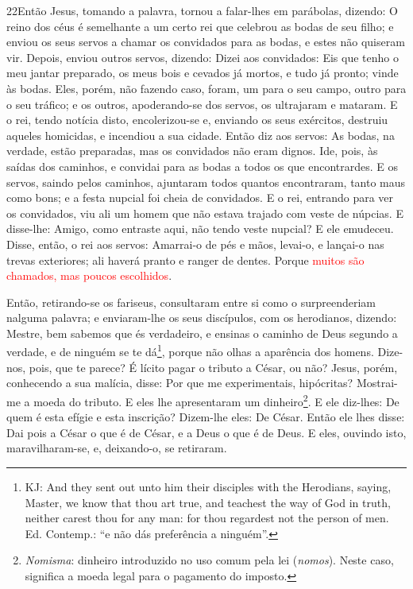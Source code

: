 \medskip

\lettrine{22} Então Jesus, tomando a palavra, tornou a
falar-lhes em parábolas, dizendo: O reino dos céus é semelhante
a um certo rei que celebrou as bodas de seu filho; e enviou os
seus servos a chamar os convidados para as bodas, e estes não
quiseram vir. Depois, enviou outros servos, dizendo: Dizei aos
convidados: Eis que tenho o meu jantar preparado, os meus bois e
cevados já mortos, e tudo já pronto; vinde às bodas. Eles,
porém, não fazendo caso, foram, um para o seu campo, outro para o
seu tráfico; e os outros, apoderando-se dos servos, os
ultrajaram e mataram. E o rei, tendo notícia disto,
encolerizou-se e, enviando os seus exércitos, destruiu aqueles
homicidas, e incendiou a sua cidade. Então diz aos servos: As
bodas, na verdade, estão preparadas, mas os convidados não eram
dignos. Ide, pois, às saídas dos caminhos, e convidai para as
bodas a todos os que encontrardes. E os servos, saindo pelos
caminhos, ajuntaram todos quantos encontraram, tanto maus como bons;
e a festa nupcial foi cheia de convidados. E o rei, entrando
para ver os convidados, viu ali um homem que não estava trajado com
veste de núpcias. E disse-lhe: Amigo, como entraste aqui, não
tendo veste nupcial? E ele emudeceu. Disse, então, o rei aos
servos: Amarrai-o de pés e mãos, levai-o, e lançai-o nas trevas
exteriores; ali haverá pranto e ranger de dentes. Porque
\textcolor{red}{muitos são chamados, mas poucos escolhidos}.

Então, retirando-se os fariseus, consultaram entre si como o
surpreenderiam nalguma palavra; e enviaram-lhe os seus
discípulos, com os herodianos, dizendo: Mestre, bem sabemos que és
verdadeiro, e ensinas o caminho de Deus segundo a verdade, e de
ninguém se te dá\footnote{KJ: And they sent out unto him their
disciples with the Herodians, saying, Master, we know that thou art
true, and teachest the way of God in truth, neither carest thou for
any man: for thou regardest not the person of men. Ed. Contemp.: 	``e
não dás preferência a ninguém''.}, porque não olhas a aparência dos
homens. Dize-nos, pois, que te parece? É lícito pagar o
tributo a César, ou não? Jesus, porém, conhecendo a sua
malícia, disse: Por que me experimentais, hipócritas?
Mostrai-me a moeda do tributo. E eles lhe apresentaram um
dinheiro\footnote{\emph{Nomisma}: dinheiro introduzido no uso comum
pela lei (\emph{nomos}). Neste caso, significa a moeda legal para o
pagamento do imposto.}. E ele diz-lhes: De quem é esta efígie
e esta inscrição? Dizem-lhe eles: De César. Então ele lhes
disse: Dai pois a César o que é de César, e a Deus o que é de Deus.
E eles, ouvindo isto, maravilharam-se, e, deixando-o, se
retiraram.

